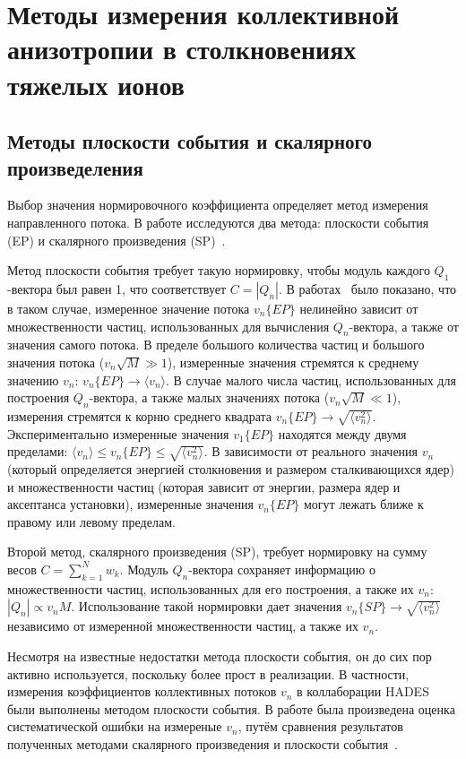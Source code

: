 \section{Методы измерения коллективной анизотропии в столкновениях тяжелых ионов}

\subsection{Методы плоскости события и скалярного произведеления}

Выбор значения нормировочного коэффициента определяет метод измерения направленного потока. 
В работе исследуются два метода: плоскости события (EP) и скалярного произведения (SP)~\cite{Mamaev:2020lpi}. 

Метод плоскости события требует такую нормировку, чтобы модуль каждого $Q_1$-вектора был равен 1, что соответствует $C=|Q_n|$. 
В работах~\cite{Borghini:2001vi, Bhalerao:2006tp} было показано, что в таком случае, измеренное значение потока $v_n\{EP\}$ нелинейно зависит от множественности частиц, использованных для вычисления $Q_n$-вектора, а также от значения самого потока. 
В пределе большого количества частиц и большого значения потока ($v_n \sqrt{M} \gg 1$), измеренные значения стремятся к среднему значению $v_n$: $v_n\{EP\} \xrightarrow{} \langle v_n \rangle$. 
В случае малого числа частиц, использованных для построения $Q_n$-вектора, а также малых значениях потока ($v_n \sqrt{M} \ll 1$), измерения стремятся к корню среднего квадрата $ v_n\{EP\} \xrightarrow{} \sqrt{ \langle v_n^2 \rangle }$.
Экспериментально измеренные значения $v_1\{EP\}$ находятся между двумя пределами: $ \langle v_n \rangle \leq v_n\{EP\} \leq \sqrt{ \langle v_n^2 \rangle } $.
В зависимости от реального значения $v_n$ (который определяется энергией столкновения и размером сталкивающихся ядер) и множественности частиц (которая зависит от энергии, размера ядер и аксептанса установки), измеренные значения $v_n\{EP\}$ могут лежать ближе к правому или левому пределам.

Второй метод, скалярного произведения (SP), требует нормировку на сумму весов $C=\sum_{k=1}^N w_k$.
Модуль $Q_n$-вектора сохраняет информацию о множественности частиц, использованных для его построения, а также их $v_n$: $|Q_n| \propto v_n M$.
Использование такой нормировки дает значения $v_n\{SP\} \xrightarrow{} \sqrt{\langle v_n^2 \rangle}$ независимо от измеренной множественности частиц, а также их $v_n$.

Несмотря на известные недостатки метода плоскости события, он до сих пор активно используется, поскольку более прост в реализации. 
В частности, измерения коэффициентов коллективных потоков $v_n$ в коллаборации HADES~\cite{HADES:2020lob} были выполнены методом плоскости события. 
В работе была произведена оценка систематической ошибки на измереные $v_n$, путём сравнения результатов полученных методами скалярного произведения и плоскости события~\cite{Mamaev:2020lpi}.

